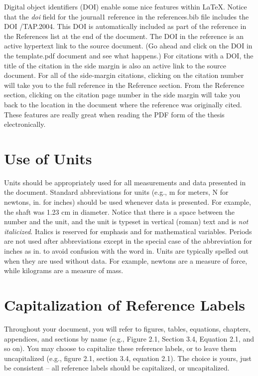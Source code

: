 Digital object identifiers (DOI) enable some nice features within {\rmfamily\LaTeX{}}. Notice that the {\em doi} field for the {\ttfamily journal1} reference in the {\ttfamily references.bib} file includes the DOI {/TAP.2004}. This DOI is automatically included as part of the reference in the References list at the end of the document. The DOI in the reference is an active hypertext link to the source document. (Go ahead and click on the DOI in the {\ttfamily template.pdf} document and see what happens.) For citations with a DOI, the title of the citation in the side margin is also an active link to the source document. For all of the side-margin citations, clicking on the citation number will take you to the full reference in the Reference section. From the Reference section, clicking on the citation page number in the side margin will take you back to the location in the document where the reference was originally cited. These features are really great when reading the PDF form of the thesis electronically.

\section{Use of Units}
Units should be appropriately used for all measurements and data presented in the document. Standard abbreviations for units (e.g., m for meters, N for newtons, in. for inches) should be used whenever data is presented. For example, the shaft was 1.23 cm in diameter. Notice that there is a space between the number and the unit, and the unit is typeset in vertical (roman) text and is {\em not italicized}. Italics is reserved for emphasis and for mathematical variables. Periods are not used after abbreviations except in the special case of the abbreviation for inches as in. to avoid confusion with the word in. Units are typically spelled out when they are used without data. For example, newtons are a measure of force, while kilograms are a measure of mass.

\section{Capitalization of Reference Labels}
Throughout your document, you will refer to figures, tables, equations, chapters, appendices, and sections by name (e.g., Figure 2.1, Section 3.4, Equation 2.1, and so on). You may choose to capitalize these reference labels, or to leave them uncapitalized (e.g., figure 2.1, section 3.4, equation 2.1). The choice is yours, just be consistent -- all reference labels should be capitalized, or uncapitalized.

